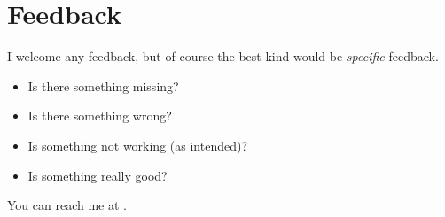 \section{Feedback}
\label{sec:feedback}

I welcome any feedback, but of course the best kind would be \emph{specific} feedback.
\begin{itemize}
	\item Is there something missing?
	\item Is there something wrong?
	\item Is something not working (as intended)?
	\item Is something really good?
\end{itemize}
You can reach me at .

